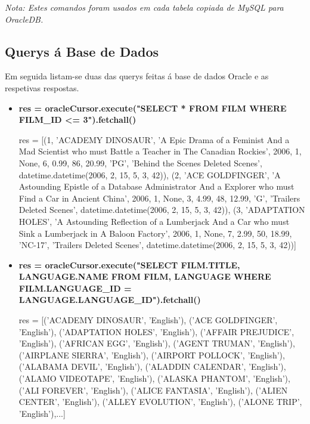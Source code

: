 \textit{Nota: Estes comandos foram usados em cada tabela copiada de MySQL para OracleDB.}

\subsection{Querys á Base de Dados}

Em seguida listam-se duas das querys feitas á base de dados Oracle e as respetivas respostas.

\begin{itemize}
\item \textbf{res = oracleCursor.execute("SELECT * FROM FILM WHERE FILM\_ID <= 3").fetchall()}

res = [(1, 'ACADEMY DINOSAUR', 'A Epic Drama of a Feminist And a Mad Scientist who must Battle a Teacher in The Canadian Rockies', 2006, 1, None, 6, 0.99, 86, 20.99, 'PG', 'Behind the Scenes Deleted Scenes', datetime.datetime(2006, 2, 15, 5, 3, 42)), (2, 'ACE GOLDFINGER', 'A Astounding Epistle of a Database Administrator And a Explorer who must Find a Car in Ancient China', 2006, 1, None, 3, 4.99, 48, 12.99, 'G', 'Trailers Deleted Scenes', datetime.datetime(2006, 2, 15, 5, 3, 42)), (3, 'ADAPTATION HOLES', 'A Astounding Reflection of a Lumberjack And a Car who must Sink a Lumberjack in A Baloon Factory', 2006, 1, None, 7, 2.99, 50, 18.99, 'NC-17', 'Trailers Deleted Scenes', datetime.datetime(2006, 2, 15, 5, 3, 42))]


\item \textbf{res = oracleCursor.execute("SELECT FILM.TITLE, LANGUAGE.NAME FROM FILM, LANGUAGE WHERE FILM.LANGUAGE\_ID = LANGUAGE.LANGUAGE\_ID").fetchall()}

res =  [('ACADEMY DINOSAUR', 'English'), ('ACE GOLDFINGER', 'English'), ('ADAPTATION HOLES', 'English'), ('AFFAIR PREJUDICE', 'English'), ('AFRICAN EGG', 'English'), ('AGENT TRUMAN', 'English'), ('AIRPLANE SIERRA', 'English'), ('AIRPORT POLLOCK', 'English'), ('ALABAMA DEVIL', 'English'), ('ALADDIN CALENDAR', 'English'), ('ALAMO VIDEOTAPE', 'English'), ('ALASKA PHANTOM', 'English'), ('ALI FOREVER', 'English'), ('ALICE FANTASIA', 'English'), ('ALIEN CENTER', 'English'), ('ALLEY EVOLUTION', 'English'), ('ALONE TRIP', 'English'),...]
\end{itemize}











